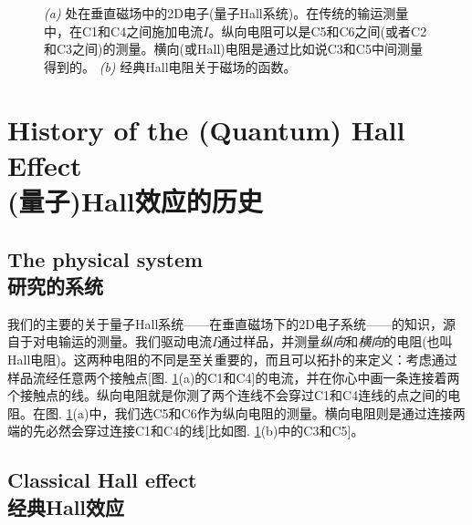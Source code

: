 \documentclass[10pt]{book}
\newcommand\itt{\it\color{blue}}
\begin{document}
\begin{figure}
\begin{center}
\end{center}
\caption{ {\sl (a)} 处在垂直磁场中的2D电子(量子Hall系统)。在传统的输运测量中，在C1和C4之间施加电流$I$。纵向电阻可以是C5和C6之间(或者C2和C3之间)的测量。横向(或Hall)电阻是通过比如说C3和C5中间测量得到的。
{\sl (b)} 经典Hall电阻关于磁场的函数。}
\label{fig01}
\end{figure}



\section[(量子)Hall效应的历史]{History of the (Quantum) Hall Effect\\\bf (量子)Hall效应的历史}
\label{hist}



\subsection[研究的系统]{The physical system\\\bf 研究的系统}

我们的主要的关于量子Hall系统——在垂直磁场下的2D电子系统——的知识，源自于对电输运的测量。我们驱动电流$I$通过样品，并测量{\itt 纵向}和{\itt 横向}的电阻(也叫Hall电阻)。这两种电阻的不同是至关重要的，而且可以拓扑的来定义：考虑通过样品流经任意两个接触点[图. \ref{fig01}(a)的C1和C4]的电流，并在你心中画一条连接着两个接触点的线。纵向电阻就是你测了两个连线不会穿过C1和C4连线的点之间的电阻。在图. \ref{fig01}(a)中，我们选C5和C6作为纵向电阻的测量。横向电阻则是通过连接两端的先必然会穿过连接C1和C4的线[比如图. \ref{fig01}(b)中的C3和C5]。



\subsection[经典Hall效应]{Classical Hall effect\\\bf 经典Hall效应}
\label{CHE}
\end{document}

